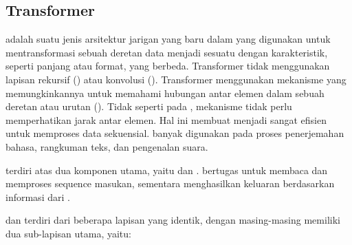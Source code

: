 \subsection{Transformer}
\label{subsec:transformer}

\transformer{} adalah suatu jenis arsitektur jarigan yang baru dalam \dl{} yang digunakan untuk mentransformasi sebuah deretan data menjadi sesuatu dengan karakteristik, seperti panjang atau format, yang berbeda. Transformer tidak menggunakan lapisan rekursif (\rnn) atau konvolusi (\cnn).  Transformer menggunakan mekanisme \selfattention{} yang memungkinkannya untuk memahami hubungan antar elemen dalam sebuah deretan atau urutan 
(\sequence). Tidak seperti pada \rnn{}, mekanisme \selfattention tidak perlu memperhatikan jarak antar elemen. Hal ini membuat \transformer{} menjadi sangat efisien untuk memproses data sekuensial. \transformer{} banyak digunakan pada proses penerjemahan bahasa, rangkuman teks, dan pengenalan suara.  

\transformer{} terdiri atas dua komponen utama, yaitu \encoder{} dan \decoder. \encoderfl{} bertugas untuk membaca dan memproses sequence masukan, sementara \decoder{} menghasilkan \sequence{} keluaran berdasarkan informasi dari \encoder.  

\encoderfl{} dan \decoder{} terdiri dari beberapa lapisan yang identik, dengan masing-masing memiliki dua sub-lapisan utama, yaitu:

